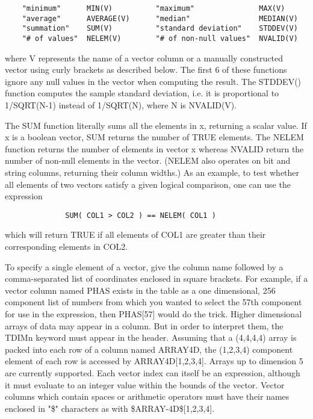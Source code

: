 \documentclass[11pt]{book}
\begin{document}
\begin{verbatim}
    "minimum"      MIN(V)          "maximum"               MAX(V)
    "average"      AVERAGE(V)      "median"                MEDIAN(V)
    "summation"    SUM(V)          "standard deviation"    STDDEV(V)
    "# of values"  NELEM(V)        "# of non-null values"  NVALID(V)
\end{verbatim}
    where V represents the name of a vector column or a manually
    constructed vector using curly brackets as described below.  The
    first 6 of these functions ignore any null values in the vector when
    computing the result.  The STDDEV() function computes the sample
    standard deviation, i.e. it is proportional to 1/SQRT(N-1) instead
    of 1/SQRT(N), where N is NVALID(V).

    The SUM function literally sums all  the elements in x,  returning a
    scalar value.   If x  is  a  boolean  vector, SUM returns the number
    of TRUE elements. The NELEM function  returns the number of elements
    in vector x whereas NVALID return the number of non-null elements in
    the  vector.   (NELEM  also  operates  on  bit  and string  columns,
    returning their column widths.)  As an example, to  test whether all
    elements of two vectors satisfy a  given logical comparison, one can
    use the expression

\begin{verbatim}
              SUM( COL1 > COL2 ) == NELEM( COL1 )
\end{verbatim}

    which will return TRUE if all elements  of  COL1  are  greater  than
    their corresponding elements in COL2.

    To  specify  a  single  element  of  a  vector, give the column name
    followed by  a  comma-separated  list  of  coordinates  enclosed  in
    square  brackets.  For example, if a vector column named PHAS exists
    in the table as a one dimensional, 256  component  list  of  numbers
    from  which  you  wanted to select the 57th component for use in the
    expression, then PHAS[57] would do the  trick.   Higher  dimensional
    arrays  of  data  may appear in a column.  But in order to interpret
    them, the TDIMn keyword must appear in the header.  Assuming that  a
    (4,4,4,4)  array  is packed into each row of a column named ARRAY4D,
    the  (1,2,3,4)  component  element  of  each  row  is  accessed   by
    ARRAY4D[1,2,3,4].    Arrays   up   to   dimension  5  are  currently
    supported.  Each vector index can itself be an expression,  although
    it  must  evaluate  to  an  integer  value  within the bounds of the
    vector.  Vector columns which contain spaces or arithmetic operators
    must   have   their   names  enclosed  in  "\$"  characters  as  with
    \$ARRAY-4D\$[1,2,3,4].
\end{document}
